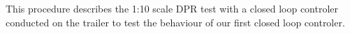 This procedure describes the 1:10 scale DPR test with a closed loop controler conducted on the trailer to test the behaviour of our first closed loop controler. 
